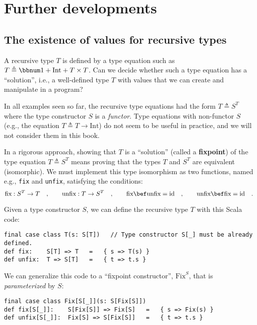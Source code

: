 \section{Further developments}

\subsection{The existence of values for recursive types\label{subsec:Recursive-types-and-the-existence-of-their-values}}

A recursive type $T$ is defined by a type equation such as $T\triangleq\bbnum 1+\text{Int}+T\times T$.
Can we decide whether such a type equation has a \textsf{``}solution\textsf{''}, i.e.,
a well-defined type $T$ with values that we can create and manipulate
in a program?

In all examples seen so far, the recursive type equations
had the form $T\triangleq S^{T}$ where the type constructor $S$
is a \emph{functor}. Type equations with non-functor $S$ (e.g., the
equation $T\triangleq T\rightarrow\text{Int}$) do not seem to be
useful in practice, and we will not consider them in this book.

In a rigorous approach, showing that $T$ is a \textsf{``}solution\textsf{''} (called
a \textbf{fixpoint}) of the type equation $T\triangleq S^{T}$
means proving that the types $T$ and $S^{T}$ are equivalent (isomorphic).
We must implement this type isomorphism as two functions, named e.g.,
\lstinline!fix! and \lstinline!unfix!, satisfying the conditions:
\[
\text{fix}:S^{T}\rightarrow T\quad,\quad\quad\text{unfix}:T\rightarrow S^{T}\quad,\quad\quad\text{fix}\bef\text{unfix}=\text{id}\quad,\quad\quad\text{unfix}\bef\text{fix}=\text{id}\quad.
\]

Given a type constructor $S$, we can define the recursive type $T$
with this Scala code:
\begin{lstlisting}
final case class T(s: S[T])   // Type constructor S[_] must be already defined.
def fix:    S[T] => T   =   { s => T(s) }
def unfix:  T => S[T]   =   { t => t.s }
\end{lstlisting}
We can generalize this code to a \textsf{``}fixpoint constructor\textsf{''}, $\text{Fix}^{S}$,
that is \emph{parameterized} by $S$:
\begin{lstlisting}
final case class Fix[S[_]](s: S[Fix[S]])
def fix[S[_]]:    S[Fix[S]] => Fix[S]   =   { s => Fix(s) }
def unfix[S[_]]:  Fix[S] => S[Fix[S]]   =   { t => t.s }
\end{lstlisting}

